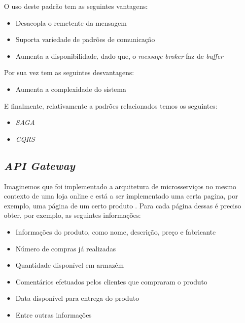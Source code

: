 O uso deste padrão tem as seguintes vantagens:
\begin{itemize}
    \item Desacopla o remetente da mensagem \cite{messagingPattern}
    \item Suporta variedade de padrões de comunicação \cite{messagingPattern}
    \item Aumenta a disponibilidade, dado que, o \textit{message broker} faz de \textit{buffer}\cite{messagingPattern}
\end{itemize}

Por sua vez tem as seguintes desvantagens:
\begin{itemize}
    \item Aumenta a complexidade do sistema \cite{messagingPattern}
\end{itemize}

E finalmente, relativamente a padrões relacionados temos os seguintes:
\begin{itemize}
    \item \textit{SAGA}
    \item \textit{CQRS}
\end{itemize}

\subsection{\textit{API Gateway}}

Imaginemos que foi implementado a arquitetura de microsserviços no mesmo contexto de uma loja online e está a ser implementado uma certa pagina, por exemplo, uma página de um certo produto \cite{apiGatewayPattern}. Para cada página dessas é preciso obter, por exemplo, as seguintes informações:

\begin{itemize}
    \item Informações do produto, como nome, descrição, preço e fabricante \cite{apiGatewayPattern}
    \item Número de compras já realizadas \cite{apiGatewayPattern}
    \item Quantidade disponível em armazém \cite{apiGatewayPattern}
    \item Comentários efetuados pelos clientes que compraram o produto \cite{apiGatewayPattern}
    \item Data disponível para entrega do produto \cite{apiGatewayPattern}
    \item Entre outras informações \cite{apiGatewayPattern}
\end{itemize}

